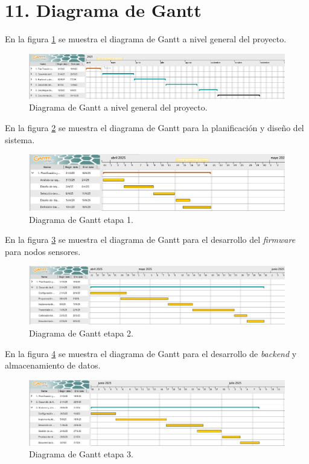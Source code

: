 \documentclass[
11pt, %
]{charter}
\begin{document}
\newpage

\section{11. Diagrama de Gantt}
\label{sec:gantt}
En la figura \ref{fig:AoN1} se muestra el diagrama de Gantt a nivel general del proyecto.
\begin{figure}[htpb]
    \centering 
    \includegraphics[width=1.05\textwidth]{./Figuras/gantt1.png}
    \caption{Diagrama de Gantt a nivel general del proyecto.}
    \label{fig:AoN1}
    \end{figure}


En la figura \ref{fig:AoN2} se muestra el diagrama de Gantt para la planificación y diseño del sistema.
\begin{figure}[htpb]
    \centering 
    \includegraphics[width=1.05\textwidth]{./Figuras/gantt2.png}
    \caption{Diagrama de Gantt etapa 1.}
    \label{fig:AoN2}
    \end{figure}

En la figura \ref{fig:AoN3} se muestra el diagrama de Gantt para el desarrollo del \textit{firmware} para nodos sensores.
\begin{figure}[htpb]
    \centering 
    \includegraphics[width=1.05\textwidth]{./Figuras/gantt3.png}
    \caption{Diagrama de Gantt etapa 2.}
    \label{fig:AoN3}
    \end{figure}

    \newpage

En la figura \ref{fig:AoN4} se muestra el diagrama de Gantt para el desarrollo de \textit{backend} y almacenamiento de datos.
\begin{figure}[htpb]
    \centering 
    \includegraphics[width=1.05\textwidth]{./Figuras/gantt4.png}
    \caption{Diagrama de Gantt etapa 3.}
    \label{fig:AoN4}
    \end{figure}
\end{document}
